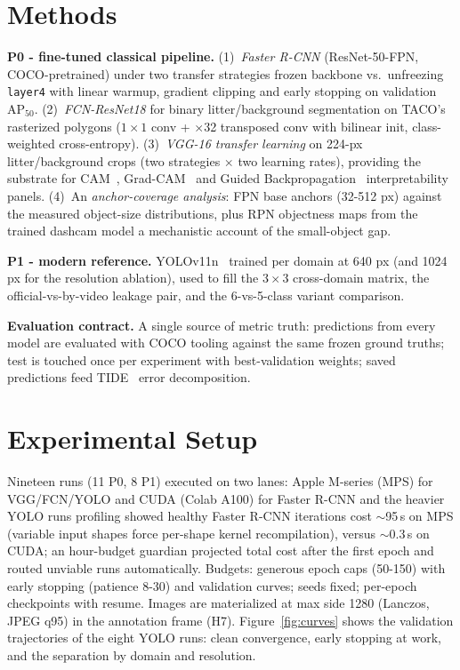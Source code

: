 \documentclass[conference]{IEEEtran}
\begin{document}
\section{Methods}
\label{sec:methods}

\textbf{P0 - fine-tuned classical pipeline.}
(1)~\emph{Faster R-CNN} (ResNet-50-FPN, COCO-pretrained) under two transfer
strategies frozen backbone vs.\ unfreezing \texttt{layer4} with linear warmup,
gradient clipping and early stopping on validation AP$_{50}$.
(2)~\emph{FCN-ResNet18} for binary litter/background segmentation on TACO's
rasterized polygons ($1\times1$ conv + $\times$32 transposed conv with bilinear
init, class-weighted cross-entropy).
(3)~\emph{VGG-16 transfer learning} on 224-px litter/background crops (two
strategies $\times$ two learning rates), providing the substrate for
CAM~\cite{cam}, Grad-CAM~\cite{gradcam} and Guided Backpropagation~\cite{guidedbp}
interpretability panels.
(4)~An \emph{anchor-coverage analysis}: FPN base anchors (32-512 px) against the
measured object-size distributions, plus RPN objectness maps from the trained
dashcam model a mechanistic account of the small-object gap.

\textbf{P1 - modern reference.} YOLOv11n~\cite{yolo11} trained per domain at
640 px (and 1024 px for the resolution ablation), used to fill the $3\times3$
cross-domain matrix, the official-vs-by-video leakage pair, and the 6-vs-5-class
variant comparison.

\textbf{Evaluation contract.} A single source of metric truth: predictions from
every model are evaluated with COCO tooling against the same frozen ground
truths; test is touched once per experiment with best-validation weights; saved
predictions feed TIDE~\cite{tide} error decomposition.

\section{Experimental Setup}
Nineteen runs (11 P0, 8 P1) executed on two lanes: Apple M-series (MPS) for
VGG/FCN/YOLO and CUDA (Colab A100) for Faster R-CNN and the heavier YOLO
runs profiling showed healthy Faster R-CNN iterations cost $\sim$95\,s on MPS
(variable input shapes force per-shape kernel recompilation), versus
$\sim$0.3\,s on CUDA; an hour-budget guardian projected total cost after the
first epoch and routed unviable runs automatically. Budgets: generous epoch caps
(50-150) with early stopping (patience 8-30) and validation curves; seeds
fixed; per-epoch checkpoints with resume. Images are materialized at max side
1280 (Lanczos, JPEG q95) in the annotation frame (H7). Figure~\ref{fig:curves} shows the validation trajectories of the eight
YOLO runs: clean convergence, early stopping at work, and the separation
by domain and resolution.
\end{document}
